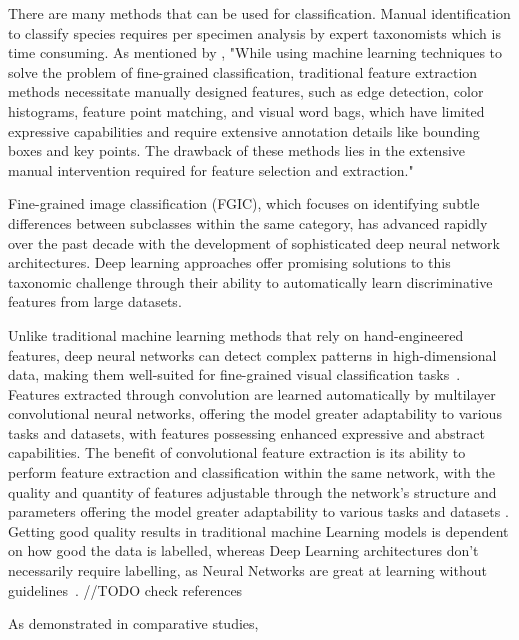 \documentclass[a4paper,12pt]{report}
\begin{document}
There are many methods that can be used for classification. Manual identification to classify species requires per specimen analysis by expert taxonomists which is time consuming. As mentioned by \citep{Lu2024}, "While using machine learning techniques to solve the problem of fine-grained classification, traditional feature extraction methods necessitate manually designed features, such as edge detection, color histograms, feature point matching, and visual word bags, which have limited expressive capabilities and require extensive annotation details like bounding boxes and key points. The drawback of these methods lies in the extensive manual intervention required for feature selection and extraction."

Fine-grained image classification (FGIC), which focuses on identifying subtle differences between subclasses within the same category, has advanced rapidly over the past decade with the development of sophisticated deep neural network architectures. Deep learning approaches offer promising solutions to this taxonomic challenge through their ability to automatically learn discriminative features from large datasets\citep{source4}. 

Unlike traditional machine learning methods that rely on hand-engineered features, deep neural networks can detect complex patterns in high-dimensional data, making them well-suited for fine-grained visual classification tasks~\citep{valan}. Features extracted through convolution are learned automatically by multilayer convolutional neural networks, offering the model greater adaptability to various tasks and datasets, with features possessing enhanced expressive and abstract capabilities. The benefit of convolutional feature extraction is its ability to perform feature extraction and classification within the same network, with the quality and quantity of features adjustable through the network's structure and parameters \citep{source2} offering the model greater adaptability to various tasks and datasets \citep{Lu2024}. Getting good quality results in traditional machine Learning models is dependent on how good the data is labelled, whereas Deep Learning architectures don't necessarily require labelling, as Neural Networks are great at learning without guidelines~\cite{source5}.
//TODO check references

As demonstrated in comparative studies, 
\end{document}
